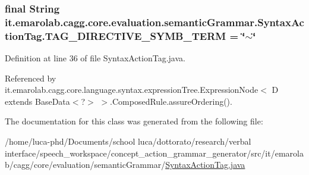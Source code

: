 \hypertarget{classit_1_1emarolab_1_1cagg_1_1core_1_1evaluation_1_1semanticGrammar_1_1SyntaxActionTag_ae3826d8f10b95308988b045fc8bf25d0}{
\subsubsection[{T\-A\-G\-\_\-\-D\-I\-R\-E\-C\-T\-I\-V\-E\-\_\-\-S\-Y\-M\-B\-\_\-\-T\-E\-R\-M}]{\setlength{\rightskip}{0pt plus 5cm}final String it.\-emarolab.\-cagg.\-core.\-evaluation.\-semantic\-Grammar.\-Syntax\-Action\-Tag.\-T\-A\-G\-\_\-\-D\-I\-R\-E\-C\-T\-I\-V\-E\-\_\-\-S\-Y\-M\-B\-\_\-\-T\-E\-R\-M = \char`\"{}$\sim$\char`\"{}\hspace{0.3cm}{\ttfamily [static]}}}\label{classit_1_1emarolab_1_1cagg_1_1core_1_1evaluation_1_1semanticGrammar_1_1SyntaxActionTag_ae3826d8f10b95308988b045fc8bf25d0}


Definition at line 36 of file Syntax\-Action\-Tag.\-java.



Referenced by it.\-emarolab.\-cagg.\-core.\-language.\-syntax.\-expression\-Tree.\-Expression\-Node$<$ D extends Base\-Data$<$?$>$ $>$.\-Composed\-Rule.\-assure\-Ordering().



The documentation for this class was generated from the following file\-:\begin{DoxyCompactItemize}
\item 
/home/luca-\/phd/\-Documents/school luca/dottorato/research/verbal interface/speech\-\_\-workspace/concept\-\_\-action\-\_\-grammar\-\_\-generator/src/it/emarolab/cagg/core/evaluation/semantic\-Grammar/\hyperlink{SyntaxActionTag_8java}{Syntax\-Action\-Tag.\-java}\end{DoxyCompactItemize}
